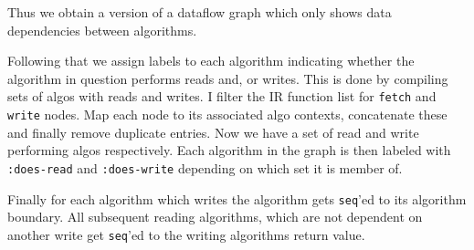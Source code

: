 Thus we obtain a version of a dataflow graph which only shows data dependencies between algorithms.

Following that we assign labels to each algorithm indicating whether the algorithm in question performs reads and, or writes.
This is done by compiling sets of algos with reads and writes.
I filter the IR function list for \texttt{fetch} and \texttt{write} nodes.
Map each node to its associated algo contexts, concatenate these and finally remove duplicate entries.
Now we have a set of read and write performing algos respectively.
Each algorithm in the graph is then labeled with \texttt{:does-read} and \texttt{:does-write} depending on which set it is member of.

Finally for each algorithm which writes the algorithm gets \texttt{seq}'ed to its algorithm boundary.
All subsequent reading algorithms, which are not dependent on another write get \texttt{seq}'ed to the writing algorithms return value.

